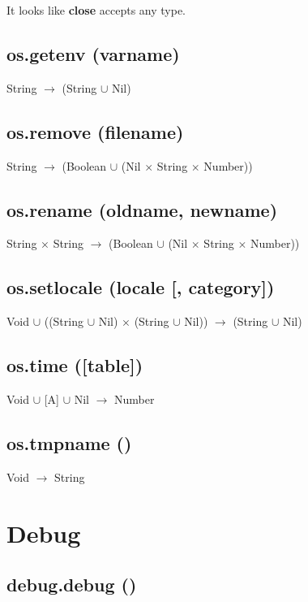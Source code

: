 \documentclass[12pt]{article}
\begin{document}
It looks like \textbf{close} accepts any type.

\subsection{os.getenv (varname)}

String $\rightarrow$ (String $\cup$ Nil)

\subsection{os.remove (filename)}

String $\rightarrow$
(Boolean $\cup$ (Nil $\times$ String $\times$ Number))

\subsection{os.rename (oldname, newname)}

String $\times$ String $\rightarrow$
(Boolean $\cup$ (Nil $\times$ String $\times$ Number))

\subsection{os.setlocale (locale [, category])}

Void $\cup$
((String $\cup$ Nil) $\times$
(String $\cup$ Nil)) $\rightarrow$
(String $\cup$ Nil)

\subsection{os.time ([table])}

Void $\cup$ [A] $\cup$ Nil $\rightarrow$ Number

\subsection{os.tmpname ()}

Void $\rightarrow$ String

\newpage

\section{Debug}

\subsection{debug.debug ()}
\end{document}
